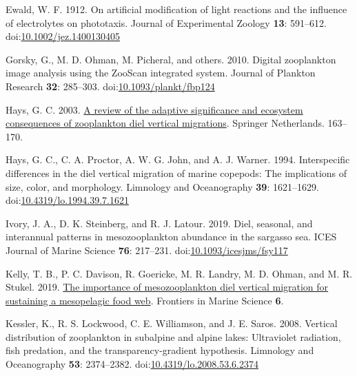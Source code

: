 \documentclass[
]{article}
\newlength{\cslhangindent}
\newlength{\cslentryspacingunit} %
\newenvironment{CSLReferences}[2] %
 {%
  \setlength{\parindent}{0pt}
  \ifodd #1
  \let\oldpar\par
  \def\par{\hangindent=\cslhangindent\oldpar}
  \fi
  \setlength{\parskip}{#2\cslentryspacingunit}
 }%
 {}
\begin{document}
\begin{CSLReferences}{1}{0}
\leavevmode{}%
Ewald, W. F. 1912. On artificial modification of light reactions and the
influence of electrolytes on phototaxis. Journal of Experimental Zoology
\textbf{13}: 591--612.
doi:\href{https://doi.org/10.1002/jez.1400130405}{10.1002/jez.1400130405}

\leavevmode{}%
Gorsky, G., M. D. Ohman, M. Picheral, and others. 2010. Digital
zooplankton image analysis using the ZooScan integrated system. Journal
of Plankton Research \textbf{32}: 285--303.
doi:\href{https://doi.org/10.1093/plankt/fbp124}{10.1093/plankt/fbp124}

\leavevmode{}%
Hays, G. C. 2003. \href{https://doi.org/10.1007/978-94-017-2276-6_18}{A
review of the adaptive significance and ecosystem consequences of
zooplankton diel vertical migrations}. Springer Netherlands. 163--170.

\leavevmode{}%
Hays, G. C., C. A. Proctor, A. W. G. John, and A. J. Warner. 1994.
Interspecific differences in the diel vertical migration of marine
copepods: The implications of size, color, and morphology. Limnology and
Oceanography \textbf{39}: 1621--1629.
doi:\href{https://doi.org/10.4319/lo.1994.39.7.1621}{10.4319/lo.1994.39.7.1621}

\leavevmode{}%
Ivory, J. A., D. K. Steinberg, and R. J. Latour. 2019. Diel, seasonal,
and interannual patterns in mesozooplankton abundance in the sargasso
sea. ICES Journal of Marine Science \textbf{76}: 217--231.
doi:\href{https://doi.org/10.1093/icesjms/fsy117}{10.1093/icesjms/fsy117}

\leavevmode{}%
Kelly, T. B., P. C. Davison, R. Goericke, M. R. Landry, M. D. Ohman, and
M. R. Stukel. 2019.
\href{https://www.frontiersin.org/articles/10.3389/fmars.2019.00508}{The
importance of mesozooplankton diel vertical migration for sustaining a
mesopelagic food web}. Frontiers in Marine Science \textbf{6}.

\leavevmode{}%
Kessler, K., R. S. Lockwood, C. E. Williamson, and J. E. Saros. 2008.
Vertical distribution of zooplankton in subalpine and alpine lakes:
Ultraviolet radiation, fish predation, and the transparency-gradient
hypothesis. Limnology and Oceanography \textbf{53}: 2374--2382.
doi:\href{https://doi.org/10.4319/lo.2008.53.6.2374}{10.4319/lo.2008.53.6.2374}


\end{CSLReferences}
\end{document}
